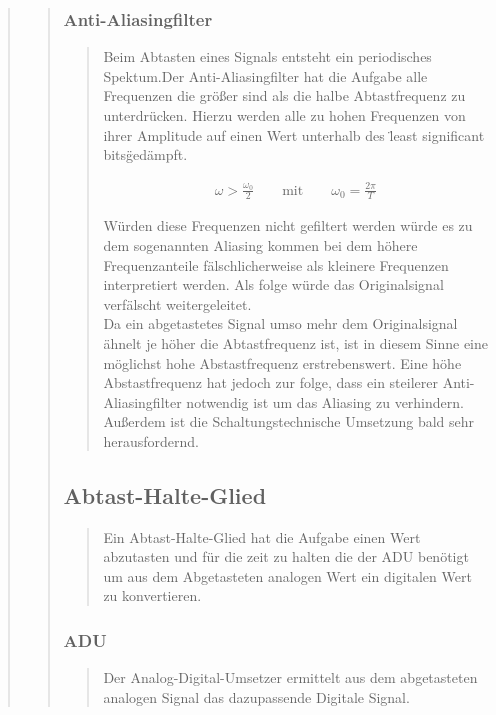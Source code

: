 \begin{quote}
\begin{quote}
		\subsubsection{Anti-Aliasingfilter}
		\begin{quote}
		      Beim Abtasten eines Signals entsteht ein periodisches Spektum.Der Anti-Aliasingfilter hat die Aufgabe alle
		      Frequenzen die größer sind als die halbe Abtastfrequenz zu unterdrücken. Hierzu werden alle zu hohen Frequenzen von ihrer Amplitude auf einen Wert unterhalb des
              \"least significant bits\" gedämpft.
		      
		      \begin{equation*}
                	\begin{split}
                		\omega > \frac{\omega_0}{2} \hspace{2em} \text{mit} \hspace{2em} \omega_0 = \frac{2\pi}{T}
                	\end{split}
                \end{equation*}
		      
		      Würden diese Frequenzen nicht gefiltert werden würde es zu dem sogenannten Aliasing kommen bei dem höhere
		      Frequenzanteile fälschlicherweise als kleinere Frequenzen interpretiert werden. Als folge würde das
		      Originalsignal verfälscht weitergeleitet.\\
		      
		      Da ein abgetastetes Signal umso mehr dem Originalsignal ähnelt je höher die Abtastfrequenz ist, ist in diesem
		      Sinne eine möglichst hohe Abstastfrequenz erstrebenswert. Eine höhe Abstastfrequenz hat jedoch zur folge, dass
		      ein steilerer Anti-Aliasingfilter notwendig ist um das Aliasing zu verhindern. Außerdem ist die
		      Schaltungstechnische Umsetzung bald sehr herausfordernd.\\
		\end{quote}
		\subsection{Abtast-Halte-Glied}
        \begin{quote}
            Ein Abtast-Halte-Glied hat die Aufgabe einen Wert abzutasten und für die zeit zu halten die der ADU
            benötigt um aus dem Abgetasteten analogen Wert ein digitalen Wert zu konvertieren.
        \end{quote}
        \subsubsection{ADU}
		\begin{quote}
			Der Analog-Digital-Umsetzer ermittelt aus dem abgetasteten analogen Signal das dazupassende Digitale Signal.
		\end{quote}
    \end{quote}
\end{quote}

